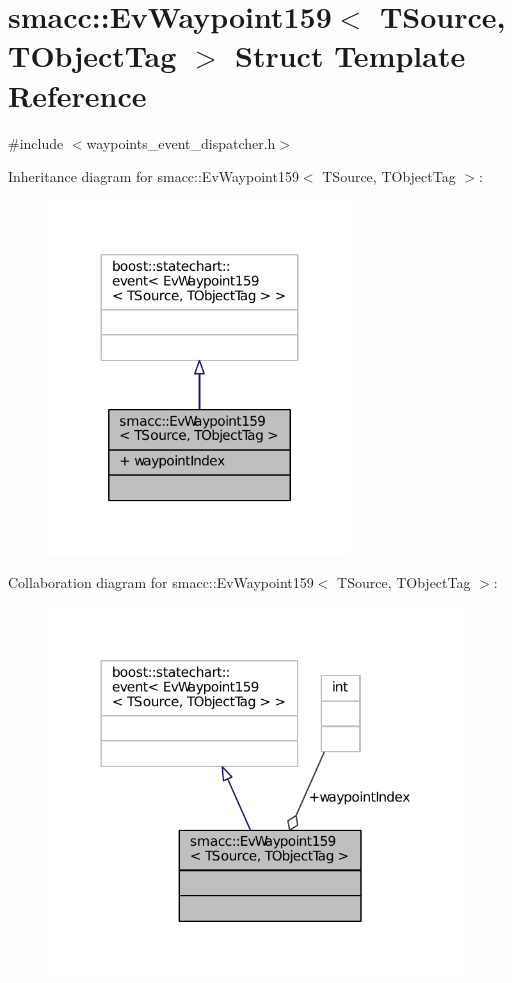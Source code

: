 \hypertarget{structsmacc_1_1EvWaypoint159}{}\section{smacc\+:\+:Ev\+Waypoint159$<$ T\+Source, T\+Object\+Tag $>$ Struct Template Reference}
\label{structsmacc_1_1EvWaypoint159}


{\ttfamily \#include $<$waypoints\+\_\+event\+\_\+dispatcher.\+h$>$}



Inheritance diagram for smacc\+:\+:Ev\+Waypoint159$<$ T\+Source, T\+Object\+Tag $>$\+:
\nopagebreak
\begin{figure}[H]
\begin{center}
\leavevmode
\includegraphics[width=227pt]{structsmacc_1_1EvWaypoint159__inherit__graph}
\end{center}
\end{figure}


Collaboration diagram for smacc\+:\+:Ev\+Waypoint159$<$ T\+Source, T\+Object\+Tag $>$\+:
\nopagebreak
\begin{figure}[H]
\begin{center}
\leavevmode
\includegraphics[width=312pt]{structsmacc_1_1EvWaypoint159__coll__graph}
\end{center}
\end{figure}
